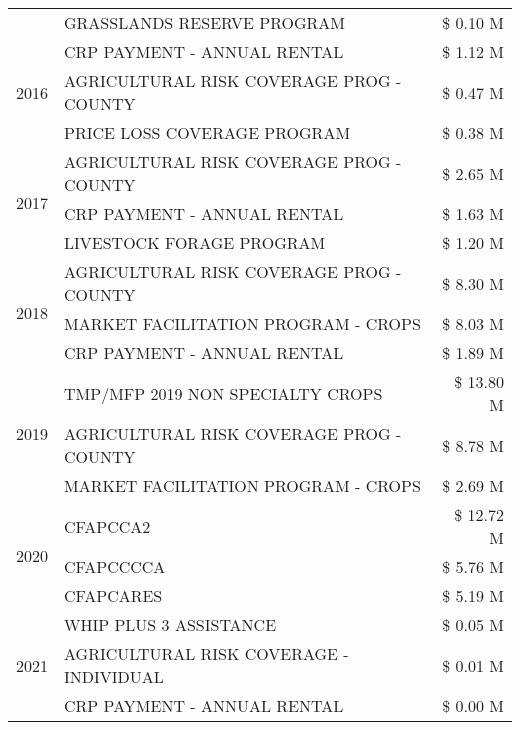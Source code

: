 \begin{tabular}{llr}
 & GRASSLANDS RESERVE PROGRAM & \$ 0.10 M \\
\cline{1-3}
\multirow[t]{3}{*}{2016} & CRP PAYMENT - ANNUAL RENTAL & \$ 1.12 M \\
 & AGRICULTURAL RISK COVERAGE PROG - COUNTY & \$ 0.47 M \\
 & PRICE LOSS COVERAGE PROGRAM & \$ 0.38 M \\
\cline{1-3}
\multirow[t]{3}{*}{2017} & AGRICULTURAL RISK COVERAGE PROG - COUNTY & \$ 2.65 M \\
 & CRP PAYMENT - ANNUAL RENTAL & \$ 1.63 M \\
 & LIVESTOCK FORAGE PROGRAM & \$ 1.20 M \\
\cline{1-3}
\multirow[t]{3}{*}{2018} & AGRICULTURAL RISK COVERAGE PROG - COUNTY & \$ 8.30 M \\
 & MARKET FACILITATION PROGRAM - CROPS & \$ 8.03 M \\
 & CRP PAYMENT - ANNUAL RENTAL & \$ 1.89 M \\
\cline{1-3}
\multirow[t]{3}{*}{2019} & TMP/MFP 2019 NON SPECIALTY CROPS & \$ 13.80 M \\
 & AGRICULTURAL RISK COVERAGE PROG - COUNTY & \$ 8.78 M \\
 & MARKET FACILITATION PROGRAM - CROPS & \$ 2.69 M \\
\cline{1-3}
\multirow[t]{3}{*}{2020} & CFAPCCA2 & \$ 12.72 M \\
 & CFAPCCCCA & \$ 5.76 M \\
 & CFAPCARES & \$ 5.19 M \\
\cline{1-3}
\multirow[t]{3}{*}{2021} & WHIP PLUS 3 ASSISTANCE & \$ 0.05 M \\
 & AGRICULTURAL RISK COVERAGE - INDIVIDUAL & \$ 0.01 M \\
 & CRP PAYMENT - ANNUAL RENTAL & \$ 0.00 M \\
\cline{1-3}
\bottomrule
\end{tabular}
